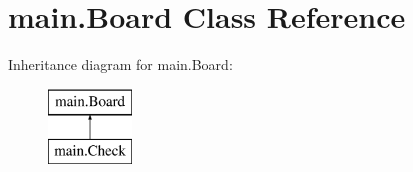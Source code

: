 \hypertarget{classmain_1_1_board}{}\section{main.\+Board Class Reference}
\label{classmain_1_1_board}
Inheritance diagram for main.\+Board\+:\begin{figure}[H]
\begin{center}
\leavevmode
\includegraphics[height=2.000000cm]{classmain_1_1_board}
\end{center}
\end{figure}
